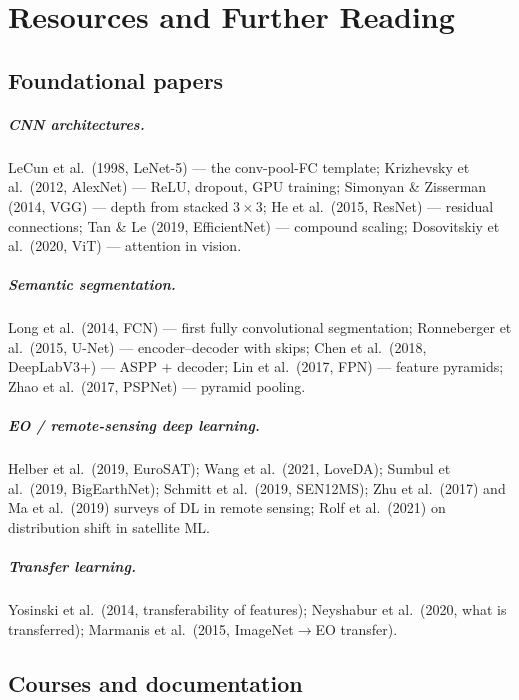 \chapter{Resources and Further Reading}
\label{app:resources}

\section{Foundational papers}

\paragraph{CNN architectures.}
LeCun et al.\ (1998, LeNet-5) --- the conv-pool-FC template;
Krizhevsky et al.\ (2012, AlexNet) --- ReLU, dropout, GPU training;
Simonyan \& Zisserman (2014, VGG) --- depth from stacked $3\times3$;
He et al.\ (2015, ResNet) --- residual connections;
Tan \& Le (2019, EfficientNet) --- compound scaling;
Dosovitskiy et al.\ (2020, ViT) --- attention in vision.

\paragraph{Semantic segmentation.}
Long et al.\ (2014, FCN) --- first fully convolutional segmentation;
Ronneberger et al.\ (2015, U-Net) --- encoder--decoder with skips;
Chen et al.\ (2018, DeepLabV3+) --- ASPP + decoder;
Lin et al.\ (2017, FPN) --- feature pyramids;
Zhao et al.\ (2017, PSPNet) --- pyramid pooling.

\paragraph{EO / remote-sensing deep learning.}
Helber et al.\ (2019, EuroSAT); Wang et al.\ (2021, LoveDA);
Sumbul et al.\ (2019, BigEarthNet); Schmitt et al.\ (2019, SEN12MS);
Zhu et al.\ (2017) and Ma et al.\ (2019) surveys of DL in remote sensing;
Rolf et al.\ (2021) on distribution shift in satellite ML.

\paragraph{Transfer learning.}
Yosinski et al.\ (2014, transferability of features);
Neyshabur et al.\ (2020, what is transferred);
Marmanis et al.\ (2015, ImageNet$\to$EO transfer).

\section{Courses and documentation}


